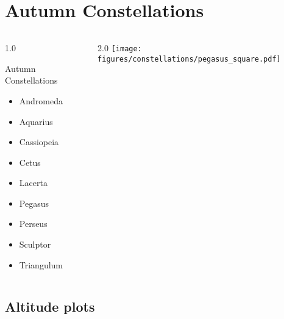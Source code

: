 \documentclass[final]{beamer}
\newlength{\colwidth}
\begin{document}
\section{Autumn Constellations}

\begin{frame}[t]{}
  \begin{columns}[T]
    \begin{column}{1.0\colwidth}
      \Large
      \begin{block}{Autumn Constellations}
        \begin{itemize}
          \item{Andromeda}
          \item{Aquarius}
          \item{Cassiopeia}
          \item{Cetus}
          \item{Lacerta}
          \item{Pegasus}
          \item{Perseus}
          \item{Sculptor}
          \item{Triangulum}
        \end{itemize}
      \end{block}
    \end{column}
    \begin{column}{2.0\colwidth}
      \centering
      \texttt{[image: figures/constellations/pegasus\_square.pdf]}
    \end{column}
  \end{columns}
\end{frame}

\subsection{Altitude plots}
\end{document}
